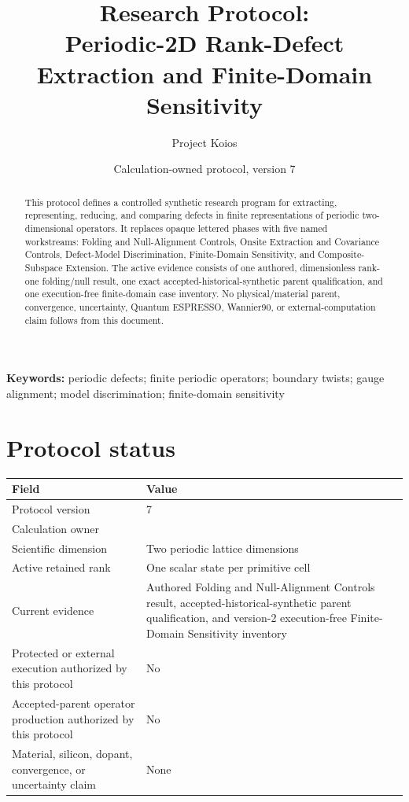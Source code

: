 \documentclass[11pt]{article}
\title{Research Protocol:\\Periodic-2D Rank-Defect Extraction and Finite-Domain Sensitivity}
\author{Project Koios}
\date{Calculation-owned protocol, version 7}
\begin{document}
\maketitle

\begin{abstract}
This protocol defines a controlled synthetic research program for extracting,
representing, reducing, and comparing defects in finite representations of periodic
two-dimensional operators.  It replaces opaque lettered phases with five named
workstreams: Folding and Null-Alignment Controls, Onsite Extraction and Covariance
Controls, Defect-Model Discrimination, Finite-Domain Sensitivity, and
Composite-Subspace Extension.  The active evidence consists of one authored,
dimensionless rank-one folding/null result, one exact accepted-historical-synthetic
parent qualification, and one execution-free finite-domain case inventory.  No
physical/material parent, convergence, uncertainty, Quantum ESPRESSO, Wannier90, or
external-computation claim follows from this document.
\end{abstract}

\noindent\textbf{Keywords:} periodic defects; finite periodic operators; boundary
twists; gauge alignment; model discrimination; finite-domain sensitivity

\tableofcontents
\clearpage
\listoffigures
\clearpage

\section{Protocol status}

\begin{center}
\small
\begin{tabularx}{\textwidth}{>{\raggedright\arraybackslash}p{}Y}
\toprule
\textbf{Field} & \textbf{Value} \\
\midrule
Protocol version & 7 \\
Calculation owner &  \\
Scientific dimension & Two periodic lattice dimensions \\
Active retained rank & One scalar state per primitive cell \\
Current evidence & Authored Folding and Null-Alignment Controls result, accepted-historical-synthetic parent qualification, and version-2 execution-free Finite-Domain Sensitivity inventory \\
Protected or external execution authorized by this protocol & No \\
Accepted-parent operator production authorized by this protocol & No \\
Material, silicon, dopant, convergence, or uncertainty claim & None \\
\bottomrule
\end{tabularx}
\end{center}
\end{document}
